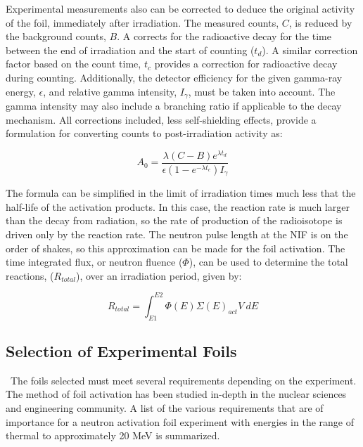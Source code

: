 Experimental measurements also can be corrected to deduce the original activity of the foil, immediately after irradiation. The measured counts, $C$, is reduced by the background counts, $B$. A corrects for the radioactive decay for the time between the end of irradiation and the start of counting ($t_{d}$). A similar correction factor based on the count time, $t_{c}$ provides a correction for radioactive decay during counting. Additionally, the detector efficiency for the given gamma-ray energy, $\epsilon$, and relative gamma intensity, $I_{\gamma}$, must be taken into account. The gamma intensity may also include a branching ratio if applicable to the decay mechanism. All corrections included, less self-shielding effects, provide a formulation for converting counts to post-irradiation activity as:  

\begin{equation} \label{eq:MeasActivity}
A_{0} = \frac{\lambda (C-B) e^{\lambda t_{d}}}{\epsilon (1-e^{-\lambda 
t_{c}})I_{\gamma}}
\end{equation}

The formula can be simplified in the limit of irradiation times much less that 
the half-life of the activation products. In this case, the reaction rate is 
much larger than the decay from radiation, so the rate of production of the 
radioisotope is driven only by the reaction rate. The neutron pulse length at the NIF is on the order of shakes, so this approximation can be made for the foil activation. The time integrated flux, or neutron fluence ($\Phi$), can be used to determine the total reactions, ($R_{total}$),
over an irradiation period, given by:

\begin{equation} \label{eq:NIFrxnRate}
 R_{total} = \int_{E1}^{E2} \Phi(E) \Sigma(E) _{act} V \:dE 
\end{equation}

\subsection{Selection of Experimental Foils}
\ The foils selected must meet several requirements depending on the 
experiment. The method of foil activation has been studied in-depth in the 
nuclear sciences and engineering community. A list of the various 
requirements that are of importance for a neutron activation foil experiment 
with energies in the range of thermal to approximately 20 MeV is summarized\cite{Knoll,Luciano2012a,Kuijpers1977}.

